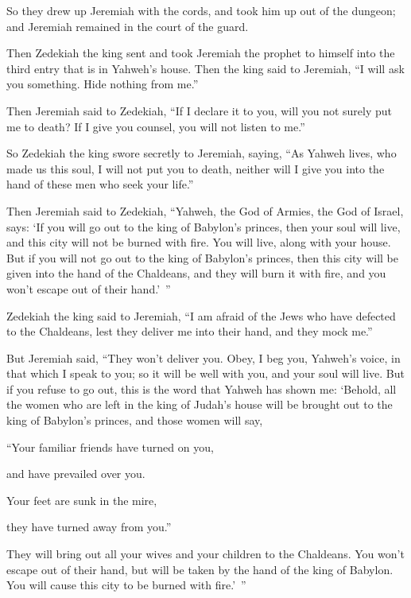 {So they drew up Jeremiah with the cords, and took him up out of the dungeon; and Jeremiah remained in the court of the guard.
\par }{\PP {}Then Zedekiah the king sent and took Jeremiah the prophet to himself into the third entry that is in Yahweh’s house. Then the king said to Jeremiah, “I will ask you something. Hide nothing from me.”
\par }{\PP {}Then Jeremiah said to Zedekiah, “If I declare it to you, will you not surely put me to death? If I give you counsel, you will not listen to me.”
\par }{\PP {}So Zedekiah the king swore secretly to Jeremiah, saying, “As Yahweh lives, who made us this soul, I will not put you to death, neither will I give you into the hand of these men who seek your life.”
\par }{\PP {}Then Jeremiah said to Zedekiah, “Yahweh, the God of Armies, the God of Israel, says: ‘If you will go out to the king of Babylon’s princes, then your soul will live, and this city will not be burned with fire. You will live, along with your house.
But if you will not go out to the king of Babylon’s princes, then this city will be given into the hand of the Chaldeans, and they will burn it with fire, and you won’t escape out of their hand.’ ”
\par }{\PP {}Zedekiah the king said to Jeremiah, “I am afraid of the Jews who have defected to the Chaldeans, lest they deliver me into their hand, and they mock me.”
\par }{\PP {}But Jeremiah said, “They won’t deliver you. Obey, I beg you, Yahweh’s voice, in that which I speak to you; so it will be well with you, and your soul will live.
But if you refuse to go out, this is the word that Yahweh has shown me:
‘Behold, all the women who are left in the king of Judah’s house will be brought out to the king of Babylon’s princes, and those women will say,
\par }{\Q “Your familiar friends have turned on you,
\par }{\QB and have prevailed over you.
\par }{\Q Your feet are sunk in the mire,
\par }{\QB they have turned away from you.”
\par }{\PP {}They will bring out all your wives and your children to the Chaldeans. You won’t escape out of their hand, but will be taken by the hand of the king of Babylon. You will cause this city to be burned with fire.’ ”
}
